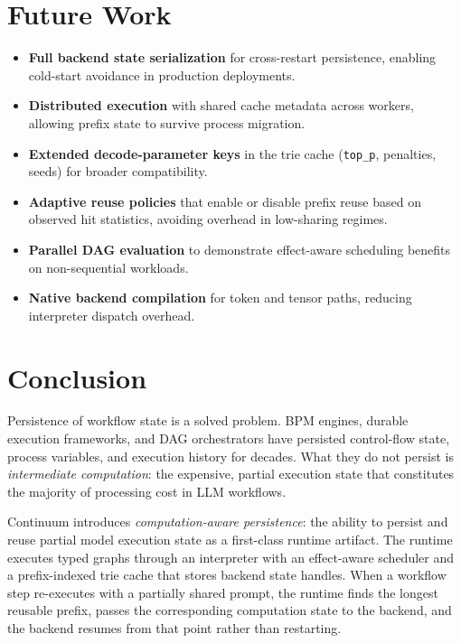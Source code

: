 \documentclass[10pt,twocolumn]{article}
\begin{document}
\section{Future Work}

\begin{itemize}[leftmargin=*]
  \item \textbf{Full backend state serialization} for cross-restart persistence, enabling cold-start avoidance in production deployments.
  \item \textbf{Distributed execution} with shared cache metadata across workers, allowing prefix state to survive process migration.
  \item \textbf{Extended decode-parameter keys} in the trie cache (\texttt{top\_p}, penalties, seeds) for broader compatibility.
  \item \textbf{Adaptive reuse policies} that enable or disable prefix reuse based on observed hit statistics, avoiding overhead in low-sharing regimes.
  \item \textbf{Parallel DAG evaluation} to demonstrate effect-aware scheduling benefits on non-sequential workloads.
  \item \textbf{Native backend compilation} for token and tensor paths, reducing interpreter dispatch overhead.
\end{itemize}

\section{Conclusion}

Persistence of workflow state is a solved problem. BPM engines, durable execution frameworks, and DAG orchestrators have persisted control-flow state, process variables, and execution history for decades. What they do not persist is \emph{intermediate computation}: the expensive, partial execution state that constitutes the majority of processing cost in LLM workflows.

Continuum introduces \emph{computation-aware persistence}: the ability to persist and reuse partial model execution state as a first-class runtime artifact. The runtime executes typed graphs through an interpreter with an effect-aware scheduler and a prefix-indexed trie cache that stores backend state handles. When a workflow step re-executes with a partially shared prompt, the runtime finds the longest reusable prefix, passes the corresponding computation state to the backend, and the backend resumes from that point rather than restarting.
\end{document}
